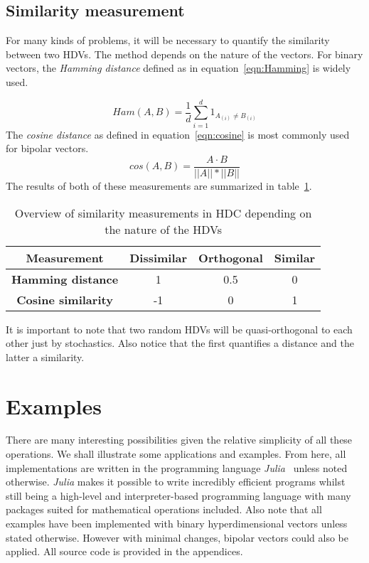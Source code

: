 \subsection*{Similarity measurement} \label{sssec:sim}
For many kinds of problems, it will be necessary to quantify the similarity between two HDVs. The method depends on the nature of the vectors. For binary vectors, the \textit{Hamming distance} defined as in equation~\ref{eqn:Hamming} is widely used.

\begin{equation}
    \label{eqn:Hamming}
    Ham(A, B) = \frac{1}{d} \sum_{i=1}^{d} 1_{A_{(i)} \neq B_{(i)}}
\end{equation}
The \textit{cosine distance} as defined in equation~\ref{eqn:cosine} is most commonly used for bipolar vectors.
\begin{equation}
    \label{eqn:cosine}
    cos(A, B) = \frac{A \cdot B}{||A|| * ||B||}
\end{equation}
The results of both of these measurements are summarized in table~\ref{tab:dist}.
\begin{table}[h]
    \caption{\label{tab:dist}Overview of similarity measurements in HDC depending on the nature of the HDVs}
    \begin{tabular}{|c||c|c|c|}
        \hline
        \textbf{Measurement} & \textbf{Dissimilar} & \textbf{Orthogonal} & \textbf{Similar} \\
        \hline
        \textbf{Hamming distance} & 1 & 0.5 & 0 \\
        \hline
        \textbf{Cosine similarity} & -1 & 0 & 1 \\
        \hline
    \end{tabular} 
\end{table}

It is important to note that two random HDVs will be quasi-orthogonal to each other just by stochastics. Also notice that the first quantifies a distance and the latter a similarity.
\section{Examples}
There are many interesting possibilities given the relative simplicity of all these operations. We shall illustrate some applications and examples. From here, all implementations are written in the programming language \textit{Julia}~\cite{Julia} unless noted otherwise. \textit{Julia} makes it possible to write incredibly efficient programs whilst still being a high-level and interpreter-based programming language with many packages suited for mathematical operations included. Also note that all examples have been implemented with binary hyperdimensional vectors unless stated otherwise. However with minimal changes, bipolar vectors could also be applied. All source code is provided in the appendices.
